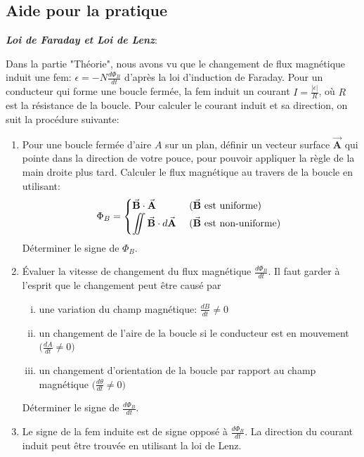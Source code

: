 \documentclass[a4paper]{article}
\begin{document}
\subsection{Aide pour la pratique}







\emph{\textbf{Loi de Faraday et Loi de Lenz}}: 

Dans la partie "Théorie", nous avons vu que le changement de flux magnétique induit une fem: $\displaystyle \epsilon = - N \frac{d \Phi_B}{d t} $ d'après la loi d'induction de Faraday. Pour un conducteur qui forme une boucle fermée, la fem induit un courant $\displaystyle I = \frac{| \epsilon |}{R} $, où $ R $ est la résistance de la boucle. Pour calculer le courant induit et sa direction, on suit la procédure suivante: 
\begin{enumerate}
    \item Pour une boucle fermée d'aire $ A $ sur un plan, définir un vecteur surface $ \vec{\textbf{A}} $ qui pointe dans la direction
de votre pouce, pour pouvoir appliquer la règle de la main droite plus tard. Calculer le flux magnétique au travers de la boucle en utilisant: 
\[ \Phi_B = 
\begin{cases}
\vec{\textbf{B}} \cdot \vec{\textbf{A}}                 & \text{ ($ \vec{\textbf{B}} $ est uniforme) } \\ \displaystyle
\iint \vec{\textbf{B}} \cdot d \vec{\textbf{A}}         & \text{ ($ \vec{\textbf{B}} $ est non-uniforme) }
\end{cases}
\]
Déterminer le signe de $ \Phi_B $.
    \item Évaluer la vitesse de changement du flux magnétique $\displaystyle \frac{d \Phi_B}{d t} $. Il faut garder à l'esprit que le
changement peut être causé par 
\begin{enumerate}[i.]
    \item une variation du champ magnétique: $\displaystyle \frac{d B}{d t} \neq 0 $
    \item un changement de l'aire de la boucle si le conducteur est en mouvement $\displaystyle \Big( \frac{d A}{d t} \neq 0 \Big) $
    \item un changement d'orientation de la boucle par rapport au champ magnétique $\displaystyle \Big( \frac{d \theta}{d t} \neq 0 \Big) $
\end{enumerate}
Déterminer le signe de $\displaystyle \frac{d \Phi_B}{d t} $.
    \item Le signe de la fem induite est de signe opposé à $\displaystyle \frac{d \Phi_B}{d t} $. La direction du courant induit peut être trouvée en utilisant la loi de Lenz.
\end{enumerate}
\end{document}
